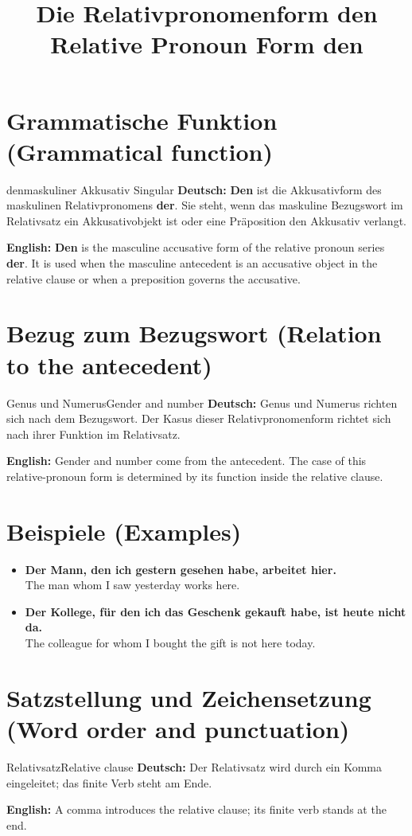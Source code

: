 \documentclass[a4paper,11pt]{article}
\title{Die Relativpronomenform \glqq den\grqq{}\\\large Relative Pronoun Form \glqq den\grqq{}}
\date{}
\newcommand{\GermanText}[1]{\textbf{Deutsch: }#1\par}
\newcommand{\EnglishText}[1]{{\small\color{SoftGray}\textbf{English: }#1\par}}
\newcommand{\ExampleItem}[2]{\item \textbf{#1}\\{\small\color{SoftGray}#2}}
\begin{document}
\maketitle
\tableofcontents
\newpage
\section{Grammatische Funktion (Grammatical function)}
\begin{grammarentry}{den}{maskuliner Akkusativ Singular}
\GermanText{\textbf{Den} ist die Akkusativform des maskulinen Relativpronomens \textbf{der}. Sie steht, wenn das maskuline Bezugswort im Relativsatz ein Akkusativobjekt ist oder eine Präposition den Akkusativ verlangt.}
\EnglishText{\textbf{Den} is the masculine accusative form of the relative pronoun series \textbf{der}. It is used when the masculine antecedent is an accusative object in the relative clause or when a preposition governs the accusative.}
\end{grammarentry}
\section{Bezug zum Bezugswort (Relation to the antecedent)}
\begin{grammarentry}{Genus und Numerus}{Gender and number}
\GermanText{Genus und Numerus richten sich nach dem Bezugswort. Der Kasus dieser Relativpronomenform richtet sich nach ihrer Funktion im Relativsatz.}
\EnglishText{Gender and number come from the antecedent. The case of this relative-pronoun form is determined by its function inside the relative clause.}
\end{grammarentry}
\section{Beispiele (Examples)}
\begin{exbox}\begin{itemize}
\ExampleItem{Der Mann, den ich gestern gesehen habe, arbeitet hier.}{The man whom I saw yesterday works here.}
\ExampleItem{Der Kollege, für den ich das Geschenk gekauft habe, ist heute nicht da.}{The colleague for whom I bought the gift is not here today.}
\end{itemize}\end{exbox}
\section{Satzstellung und Zeichensetzung (Word order and punctuation)}
\begin{grammarentry}{Relativsatz}{Relative clause}
\GermanText{Der Relativsatz wird durch ein Komma eingeleitet; das finite Verb steht am Ende.}
\EnglishText{A comma introduces the relative clause; its finite verb stands at the end.}
\end{grammarentry}
\end{document}
